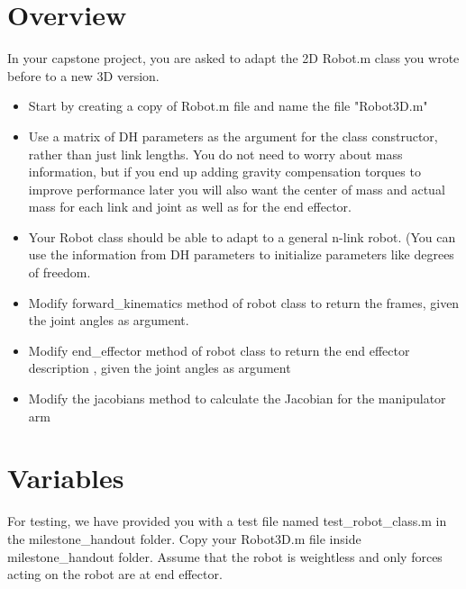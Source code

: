 \documentclass{/home/puneet/Desktop/courses/16384/Assignments/16384_doc}
\begin{document}
\maketitle

\section{Overview}
In your capstone project, you are asked to adapt the 2D Robot.m class you wrote before to a new 3D version.

\begin{itemize}
\item Start by creating a copy of Robot.m file and name the file "Robot3D.m"

\item Use a matrix of DH parameters as the argument for the class constructor,
rather than just link lengths. You do not need to worry about mass information,
but if you end up adding gravity compensation torques to improve performance
later you will also want the center of mass and actual mass for each link and joint as well as for the end effector.

\item Your Robot class should be able to adapt to a general n-link robot. (You can use the information from DH parameters to initialize parameters like degrees of freedom. 

\item Modify forward\_kinematics method of robot class to return the frames, given the joint angles as argument.

\item Modify end\_effector method of robot class to return the end effector description , given the joint angles as argument

\item Modify the jacobians method to calculate the Jacobian for the manipulator arm
\end{itemize}

\section{Variables}
For testing, we have provided you with a test file named test\_robot\_class.m in the milestone\_handout folder. Copy your Robot3D.m file inside milestone\_handout folder. Assume that the robot is weightless and only forces acting on the robot are at end effector. 
\end{document}
